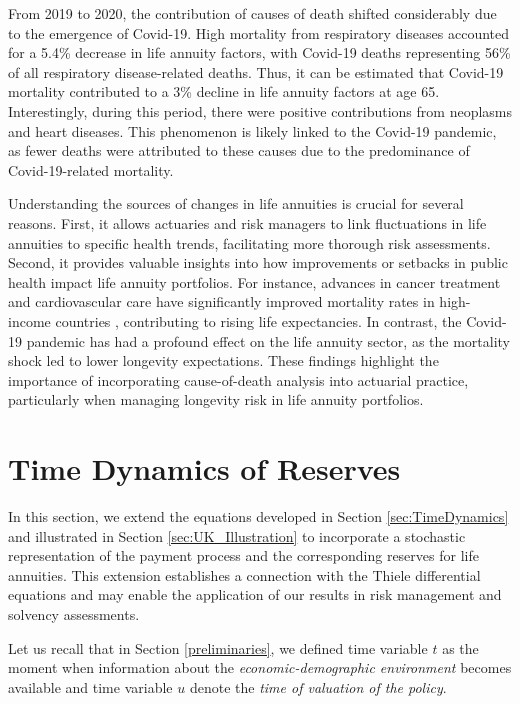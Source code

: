 \documentclass[12pt]{article}
\begin{document}
{From 2019 to 2020, the contribution of causes of death shifted considerably due to the emergence of Covid-19. High mortality from respiratory diseases accounted for a 5.4\% decrease in life annuity factors, with Covid-19 deaths representing 56\% of all respiratory disease-related deaths. Thus, it can be estimated that Covid-19 mortality contributed to a 3\% decline in life annuity factors at age 65. Interestingly, during this period, there were positive contributions from neoplasms and heart diseases. This phenomenon is likely linked to the Covid-19 pandemic, as fewer deaths were attributed to these causes due to the predominance of Covid-19-related mortality.

Understanding the sources of changes in life annuities is crucial for several reasons. First, it allows actuaries and risk managers to link fluctuations in life annuities to specific health trends, facilitating more thorough risk assessments. Second, it provides valuable insights into how improvements or setbacks in public health impact life annuity portfolios. For instance, advances in cancer treatment and cardiovascular care have significantly improved mortality rates in high-income countries \citep{weber2023gains}, contributing to rising life expectancies. In contrast, the Covid-19 pandemic has had a profound effect on the life annuity sector, as the mortality shock led to lower longevity expectations. These findings highlight the importance of incorporating cause-of-death analysis into actuarial practice, particularly when managing longevity risk in life annuity portfolios.


\FloatBarrier
\section{Time Dynamics of Reserves}\label{sec:Reserves}

In this section, we extend the equations developed in Section \ref{sec:TimeDynamics} and illustrated in Section \ref{sec:UK_Illustration} to incorporate a stochastic representation of the payment process and the corresponding reserves for life annuities. This extension establishes a connection with the Thiele differential equations and may enable the application of our results in risk management and solvency assessments.

Let us recall that in Section \ref{preliminaries}, we defined time variable \(t\) as the moment when information about the \textit{economic-demographic environment} becomes available and time variable \(u\) denote the \textit{time of valuation of the policy}. 

}
\end{document}
